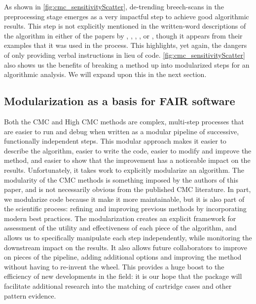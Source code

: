 As shown in \autoref{fig:cmc_sensitivityScatter}, de-trending
breech-scans in the preprocessing stage emerges as a very impactful step
to achieve good algorithmic results. This step is not explicitly
mentioned in the written-word descriptions of the algorithm in either of
the papers by \citet{song_proposed_2013}, \citet{tong_fired_2014},
\citet{tong_improved_2015}, \citet{chen_convergence_2017}, or
\citet{song_estimating_2018}, though it appears from their examples that
it was used in the process. This highlights, yet again, the dangers of
only providing verbal instructions in lieu of code.
\autoref{fig:cmc_sensitivityScatter} also shows us the benefits of
breaking a method up into modularized steps for an algorithmic analysis.
We will expand upon this in the next section.

\hypertarget{exploring}{%
\subsection{Modularization as a basis for FAIR
software}\label{exploring}}

Both the CMC and High CMC methods are complex, multi-step processes that
are easier to run and debug when written as a modular pipeline of
successive, functionally independent steps. This modular approach makes
it easier to describe the algorithm, easier to write the code, easier to
modify and improve the method, and easier to show that the improvement
has a noticeable impact on the results. Unfortunately, it takes work to
explicitly modularize an algorithm. The modularity of the CMC methods is
something imposed by the authors of this paper, and is not necessarily
obvious from the published CMC literature. In part, we modularize code
because it make it more maintainable, but it is also part of the
scientific process: refining and improving previous methods by
incorporating modern best practices. The modularization creates an
explicit framework for assessment of the utility and effectiveness of
each piece of the algorithm, and allows us to specifically manipulate
each step independently, while monitoring the downstream impact on the
results. It also allows future collaborators to improve on pieces of the
pipeline, adding additional options and improving the method without
having to re-invent the wheel. This provides a huge boost to the
efficiency of new developments in the field: it is our hope that the
 package will facilitate additional research into the
matching of cartridge cases and other pattern evidence.

